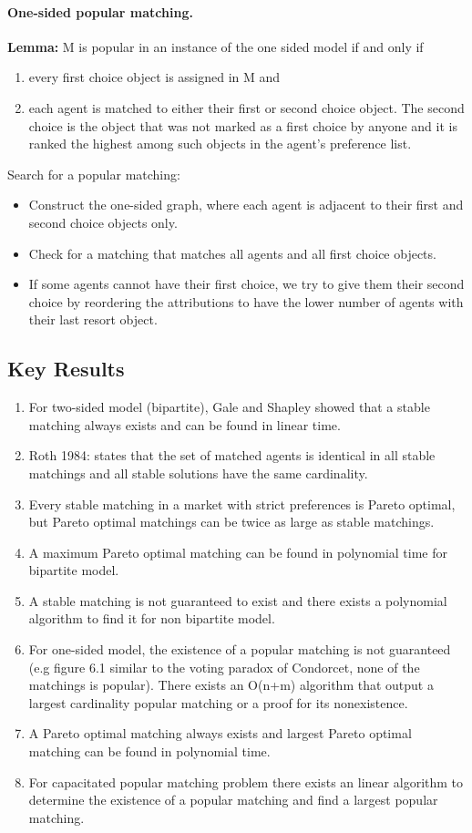 \documentclass[12pt,a4paper]{article}
\begin{document}
\paragraph{One-sided popular matching.}
\textbf{Lemma:} M is popular in an instance of the one sided model if and only if
\begin{enumerate}
    \item every first choice object is assigned in M and
    \item each agent is matched to either their first or second choice object. 
The second choice is the object that was not marked as a first choice by anyone and it is ranked the highest among such objects in the agent's preference list.
\end{enumerate}
Search for a popular matching:
\begin{itemize}
    \item Construct the one-sided graph, where each agent is adjacent to their first and second choice objects only.
    \item Check for a matching that matches all agents and all first choice objects.
    \item If some agents cannot have their first choice, we try to give them their second choice by reordering the attributions to have the lower number of agents with their last resort object.
\end{itemize}


\subsection*{Key Results}
\begin{enumerate}
    \item For two-sided model (bipartite), Gale and Shapley showed that a stable matching always exists and can be found in linear time.
    \item Roth 1984: states that the set of matched agents is identical in all stable matchings and all stable solutions have the same cardinality.
    \item Every stable matching in a market with strict preferences is Pareto optimal, but Pareto optimal matchings can be twice as large as stable matchings.
    \item A maximum Pareto optimal matching can be found in polynomial time for bipartite model.
    \item A stable matching is not guaranteed to exist and there exists a polynomial algorithm to find it for non bipartite model.
    \item For one-sided model, the existence of a popular matching is not guaranteed (e.g figure 6.1 similar to the voting paradox of Condorcet, none of the matchings is popular). There exists an O(n+m) algorithm that output a largest cardinality popular matching or a proof for its nonexistence.
    \item A Pareto optimal matching always exists and largest Pareto optimal matching can be found in polynomial time.
    \item For capacitated popular matching problem there exists an linear algorithm to determine the existence of a popular matching and find a largest popular matching.
\end{enumerate}
\end{document}

